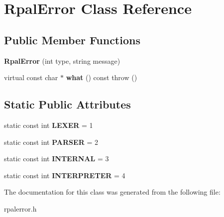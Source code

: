 \hypertarget{classRpalError}{
\section{RpalError Class Reference}
\label{classRpalError}
}
\subsection*{Public Member Functions}
\begin{DoxyCompactItemize}
\item 
\hypertarget{classRpalError_ac9862399f06a5e9001ee663749b5bbe4}{
{\bfseries RpalError} (int type, string message)}
\label{classRpalError_ac9862399f06a5e9001ee663749b5bbe4}

\item 
\hypertarget{classRpalError_aa7fff0f806c4457e51e9ae2d0204038e}{
virtual const char $\ast$ {\bfseries what} () const   throw ()}
\label{classRpalError_aa7fff0f806c4457e51e9ae2d0204038e}

\end{DoxyCompactItemize}
\subsection*{Static Public Attributes}
\begin{DoxyCompactItemize}
\item 
\hypertarget{classRpalError_a1f24d53b71e810c422d690586fa191b1}{
static const int {\bfseries LEXER} = 1}
\label{classRpalError_a1f24d53b71e810c422d690586fa191b1}

\item 
\hypertarget{classRpalError_ac3b5a0c5e6c03d56a84fa2b710ac8cfe}{
static const int {\bfseries PARSER} = 2}
\label{classRpalError_ac3b5a0c5e6c03d56a84fa2b710ac8cfe}

\item 
\hypertarget{classRpalError_af7451154cdf3f52dac9cc5c5dfc3e852}{
static const int {\bfseries INTERNAL} = 3}
\label{classRpalError_af7451154cdf3f52dac9cc5c5dfc3e852}

\item 
\hypertarget{classRpalError_a37990c79901770f8e6482721bef99ab6}{
static const int {\bfseries INTERPRETER} = 4}
\label{classRpalError_a37990c79901770f8e6482721bef99ab6}

\end{DoxyCompactItemize}


The documentation for this class was generated from the following file:\begin{DoxyCompactItemize}
\item 
rpalerror.h\end{DoxyCompactItemize}
